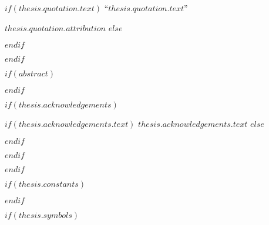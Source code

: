 \vspace*{0.2\textheight}

$if(thesis.quotation.text)$
\noindent``{\itshape $thesis.quotation.text$}''\bigbreak

\hfill $thesis.quotation.attribution$
$else$

$endif$

$endif$

$if(abstract)$

\begin{abstract}
\addchaptertocentry{\abstractname} %
$abstract$
\end{abstract}

$endif$

$if(thesis.acknowledgements)$

\begin{acknowledgements}
\addchaptertocentry{\acknowledgementname} %
$if(thesis.acknowledgements.text)$
$thesis.acknowledgements.text$
$else$

$endif$
\end{acknowledgements}

$endif$





$endif$

$if(thesis.constants)$



$endif$

$if(thesis.symbols)$

